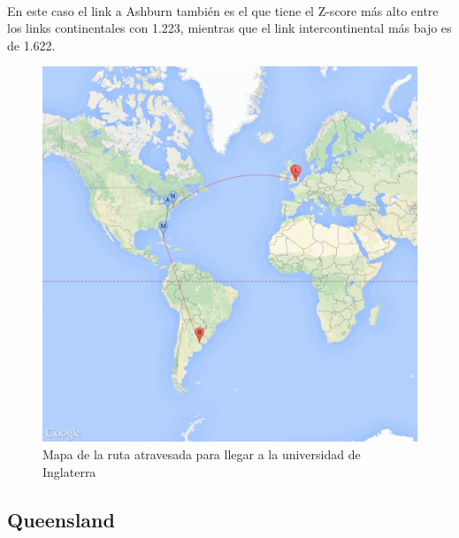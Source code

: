 ~

En este caso el link a Ashburn tambi\'en es el que tiene el Z-score m\'as alto entre los links
continentales con 1.223, mientras que el link intercontinental m\'as bajo es de 1.622.

\begin{figure}[H]
	\begin{center}
		  \includegraphics[scale=0.25]{../results/maps/Oxford.png}
		  \caption{Mapa de la ruta atravesada para llegar a la universidad de Inglaterra}
	\end{center}
\end{figure}

\subsection{Queensland}

~

